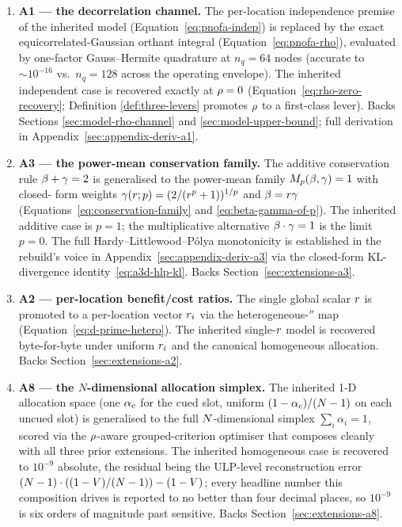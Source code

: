 \begin{enumerate}
  \item \textbf{A1 --- the decorrelation channel.}  The per-location
    independence premise of the inherited model
    (Equation~\eqref{eq:pnofa-indep}) is replaced by the exact
    equicorrelated-Gaussian orthant integral
    (Equation~\eqref{eq:pnofa-rho}), evaluated by one-factor
    Gauss--Hermite quadrature at $n_q = 64$ nodes (accurate to
    $\sim 10^{-16}$ vs.\ $n_q = 128$ across the operating envelope).
    The inherited independent case is recovered exactly at
    $\rho = 0$ (Equation~\eqref{eq:rho-zero-recovery}; Definition
    \ref{def:three-levers} promotes $\rho$ to a first-class lever).
    Backs Sections \ref{sec:model-rho-channel} and
    \ref{sec:model-upper-bound}; full derivation in
    Appendix~\ref{sec:appendix-deriv-a1}.

  \item \textbf{A3 --- the power-mean conservation family.}  The
    additive conservation rule $\beta + \gamma = 2$ is generalised
    to the power-mean family $M_p(\beta, \gamma) = 1$ with closed-
    form weights $\gamma(r; p) = (2/(r^p + 1))^{1/p}$ and
    $\beta = r \gamma$
    (Equations~\eqref{eq:conservation-family} and
    \eqref{eq:beta-gamma-of-p}).  The inherited additive case is
    $p = 1$; the multiplicative alternative
    $\beta \cdot \gamma = 1$ is the limit $p = 0$.  The full
    Hardy--Littlewood--P\'olya monotonicity is established in the
    rebuild's voice in
    Appendix~\ref{sec:appendix-deriv-a3} via the closed-form
    KL-divergence identity~\eqref{eq:a3d-hlp-kl}.  Backs
    Section~\ref{sec:extensions-a3}.

  \item \textbf{A2 --- per-location benefit/cost ratios.}  The
    single global scalar $r$ is promoted to a per-location vector
    $r_i$ via the heterogeneous-$\dprime$ map
    (Equation~\eqref{eq:d-prime-hetero}).  The inherited single-$r$
    model is recovered byte-for-byte under uniform $r_i$ and the
    canonical homogeneous allocation.  Backs
    Section~\ref{sec:extensions-a2}.

  \item \textbf{A8 --- the $N$-dimensional allocation simplex.}  The
    inherited 1-D allocation space (one $\alpha_c$ for the cued
    slot, uniform $(1 - \alpha_c)/(N - 1)$ on each uncued slot)
    is generalised to the full $N$-dimensional simplex
    $\sum_i \alpha_i = 1$, scored via the $\rho$-aware grouped-criterion
    optimiser that composes cleanly with all three prior extensions.
    The inherited homogeneous case is recovered to $10^{-9}$ absolute,
    the residual being the ULP-level reconstruction error
    $(N - 1) \cdot ((1 - V)/(N - 1)) - (1 - V)$;
    every headline number this composition drives is reported to no
    better than four decimal places, so $10^{-9}$ is six orders of
    magnitude past sensitive.  Backs
    Section~\ref{sec:extensions-a8}.
\end{enumerate}

